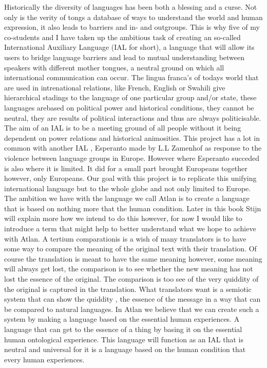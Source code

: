Historically the diversity of languages has been both a blessing and a curse. Not only is the verity of tongs a database of ways to understand the world and human expression, it also leads to barriers and in- and outgroups. This is why five of my co-students and I have taken up the ambitious task of creating an so-called International Auxiliary Language (IAL for short), a language that will allow its users to bridge language barriers and lead to mutual understanding between speakers with different mother tongues, a neutral ground on which all international communication can occur. The lingua franca’s of todays world that are used in intrenational relations, like French, English or Swahili give hierarchical stadings to the language of one particular group and/or state, these languages arebased on political power and historical conditions, they cannot be neutral, they are results of political interactions and thus are always politicisable. The aim of an IAL is to be a meeting ground of all people without it being dependent on power relations and historical animosities. This project has a lot in common with another IAL , Esperanto made by L.L Zamenhof as response to the violence between language groups in Europe. However where Esperanto succeded is also where it is limited. It did for a small part brought Europeans together however, only Europeans. Our goal with this project is to replicate this unifying international language but to the whole globe and not only limited to Europe.
The ambition we have with the language we call Atlan is to create a language that is based on nothing more that the human condition. Later in this book Stijn will explain more how we intend to do this however, for now I would like to introduce a term that might help to better understand what we hope to achieve with Atlan. A tertium comparationis is a wish of many translators is to have some way to compare the meaning of the original text with their translation. Of course the translation is meant to have the same meaning however, some meaning will always get lost, the comparison is to see whether the new meaning has not lost the essence of the original. The comparison is too see of the very quiddity of the original is captured in the translation. What translators want is a semiotic system that can show the quiddity , the essence of the message in a way that can be compared to natural languages. In Atlan we believe that we can create such a system by making a language based on the essential human experiences. A language that can get to the essence of a thing by basing it on the essential human ontological experience. This language will function as an IAL that is neutral and universal for it is a language based on the human condition that every human experiences.

